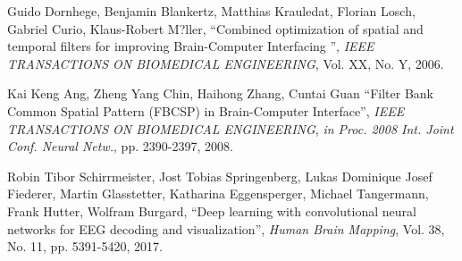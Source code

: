 \documentclass[a4paper,11pt,oneside,openany]{jsbook}
\begin{document}
\begin{thebibliography}{99}
   Guido Dornhege, Benjamin Blankertz, Matthias Krauledat, Florian Losch, Gabriel Curio, Klaus-Robert M?ller,
      ``Combined optimization of spatial and temporal
      filters for improving Brain-Computer Interfacing
      '',
      {\it IEEE TRANSACTIONS ON BIOMEDICAL ENGINEERING},
      Vol. XX,
      No. Y,
      2006.

   Kai Keng Ang, Zheng Yang Chin, Haihong Zhang, Cuntai Guan
      ``Filter Bank Common Spatial Pattern (FBCSP) in Brain-Computer Interface'',
      {\it IEEE TRANSACTIONS ON BIOMEDICAL ENGINEERING},
      {\it in Proc. 2008 Int. Joint Conf. Neural Netw.},
      pp. 2390-2397,
      2008.

   Robin Tibor Schirrmeister,
      Jost Tobias Springenberg,
      Lukas Dominique Josef Fiederer,
      Martin Glasstetter,
      Katharina Eggensperger,
      Michael Tangermann,
      Frank Hutter,
      Wolfram Burgard,
      ``Deep learning with convolutional neural networks for EEG decoding and visualization'',
      {\it Human Brain Mapping},
      Vol. 38,
      No. 11,
      pp. 5391-5420,
      2017.
\end{thebibliography}
%
%
% 
%
%
\newpage
\printindex
%
%
\end{document}
